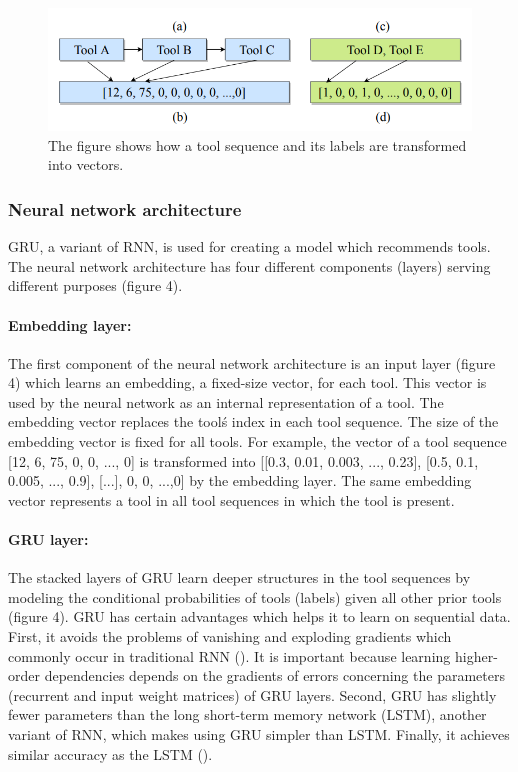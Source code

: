 \documentclass{bioinfo}
\begin{document}
\begin{figure}
\centerline{\includegraphics[scale=0.25]{bioinformatics_journal/images/label_vec.png}}
\caption{The figure shows how a tool sequence and its labels are transformed into vectors.}\label{figure:03}
\end{figure}

\subsubsection{Neural network architecture} 
GRU, a variant of RNN, is used for creating a model which recommends tools. The neural network architecture has four different components (layers) serving different purposes (figure 4).

\paragraph*{Embedding layer:}
The first component of the neural network architecture is an input layer (figure 4) which learns an embedding, a fixed-size vector, for each tool. This vector is used by the neural network as an internal representation of a tool. The embedding vector replaces the tool\'s index in each tool sequence. The size of the embedding vector is fixed for all tools. For example, the vector of a tool sequence [12, 6, 75, 0, 0, ..., 0] is transformed into [[0.3, 0.01, 0.003, ..., 0.23], [0.5, 0.1, 0.005, ..., 0.9], [...], 0, 0, ...,0] by the embedding layer. The same embedding vector represents a tool in all tool sequences in which the tool is present.

\paragraph*{GRU layer:}
The stacked layers of GRU learn deeper structures in the tool sequences by modeling the conditional probabilities of tools (labels) given all other prior tools (figure 4). GRU has certain advantages which helps it to learn on sequential data. First, it avoids the problems of vanishing and exploding gradients which commonly occur in traditional RNN (\cite{Pascanu2012UnderstandingTE}). It is important because learning higher-order dependencies depends on the gradients of errors concerning the parameters (recurrent and input weight matrices) of GRU layers. Second, GRU has slightly fewer parameters than the long short-term memory network (LSTM), another variant of RNN, which makes using GRU simpler than LSTM. Finally, it achieves similar accuracy as the LSTM (\cite{ChungGCB14}).
\end{document}
